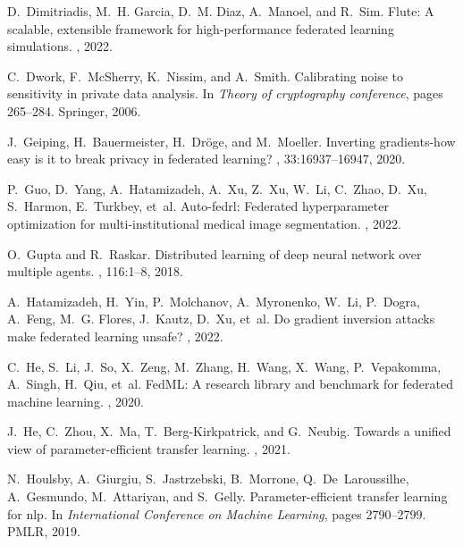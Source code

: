 \documentclass[11pt]{article}
\begin{document}
\begin{thebibliography}{10}
D.~Dimitriadis, M.~H. Garcia, D.~M. Diaz, A.~Manoel, and R.~Sim.
\newblock Flute: A scalable, extensible framework for high-performance
  federated learning simulations.
, 2022.

C.~Dwork, F.~McSherry, K.~Nissim, and A.~Smith.
\newblock Calibrating noise to sensitivity in private data analysis.
\newblock In {\em Theory of cryptography conference}, pages 265--284. Springer,
  2006.

J.~Geiping, H.~Bauermeister, H.~Dr{\"o}ge, and M.~Moeller.
\newblock Inverting gradients-how easy is it to break privacy in federated
  learning?
,
  33:16937--16947, 2020.

P.~Guo, D.~Yang, A.~Hatamizadeh, A.~Xu, Z.~Xu, W.~Li, C.~Zhao, D.~Xu,
  S.~Harmon, E.~Turkbey, et~al.
\newblock Auto-fedrl: Federated hyperparameter optimization for
  multi-institutional medical image segmentation.
, 2022.

O.~Gupta and R.~Raskar.
\newblock Distributed learning of deep neural network over multiple agents.
, 116:1--8, 2018.

A.~Hatamizadeh, H.~Yin, P.~Molchanov, A.~Myronenko, W.~Li, P.~Dogra, A.~Feng,
  M.~G. Flores, J.~Kautz, D.~Xu, et~al.
\newblock Do gradient inversion attacks make federated learning unsafe?
, 2022.

C.~He, S.~Li, J.~So, X.~Zeng, M.~Zhang, H.~Wang, X.~Wang, P.~Vepakomma,
  A.~Singh, H.~Qiu, et~al.
\newblock Fed{ML}: A research library and benchmark for federated machine
  learning.
, 2020.

J.~He, C.~Zhou, X.~Ma, T.~Berg-Kirkpatrick, and G.~Neubig.
\newblock Towards a unified view of parameter-efficient transfer learning.
, 2021.

N.~Houlsby, A.~Giurgiu, S.~Jastrzebski, B.~Morrone, Q.~De~Laroussilhe,
  A.~Gesmundo, M.~Attariyan, and S.~Gelly.
\newblock Parameter-efficient transfer learning for nlp.
\newblock In {\em International Conference on Machine Learning}, pages
  2790--2799. PMLR, 2019.


\end{thebibliography}
\end{document}
